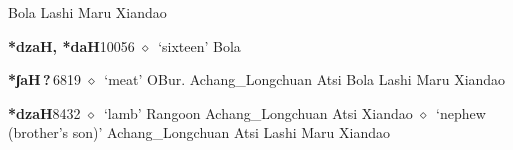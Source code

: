\begin{list}{}{\leftmargin=1.5em \itemindent=-1.5em}
         Bola 
\hspace{1ex}
         Lashi 
\hspace{1ex}
         Maru 
\hspace{1ex}
         Xiandao 
  \item {\footnotesize \textbf{*dzaH, *daH}}{\tiny 10056}
\hspace{1ex}
         $\diamond$~`sixteen'
         Bola 
  \item {\footnotesize \textbf{*ʃaH\,?\,}}{\tiny 6819}
\hspace{1ex}
         $\diamond$~`meat'
         OBur. 
\hspace{1ex}
         Achang\_Longchuan 
\hspace{1ex}
         Atsi 
\hspace{1ex}
         Bola 
\hspace{1ex}
         Lashi 
\hspace{1ex}
         Maru 
\hspace{1ex}
         Xiandao 
  \item {\footnotesize \textbf{*dzaH}}{\tiny 8432}
\hspace{1ex}
         $\diamond$~`lamb'
         Rangoon 
\hspace{1ex}
         Achang\_Longchuan 
\hspace{1ex}
         Atsi 
\hspace{1ex}
         Xiandao 
\hspace{1ex}
         $\diamond$~`nephew (brother's son)'
         Achang\_Longchuan 
\hspace{1ex}
         Atsi 
\hspace{1ex}
         Lashi 
\hspace{1ex}
         Maru 
\hspace{1ex}
         Xiandao 

\end{list}
